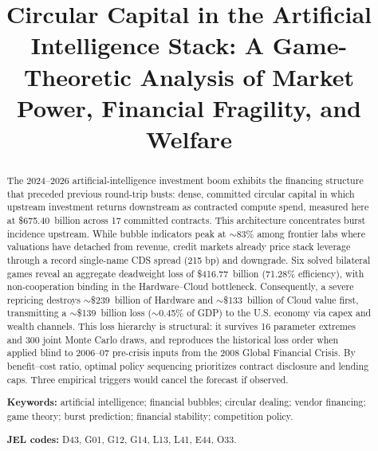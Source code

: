 \documentclass[11pt,a4paper]{article}
\title{Circular Capital in the Artificial Intelligence Stack:
A Game-Theoretic Analysis of Market Power, Financial Fragility, and Welfare}
\author{}
\date{}
\begin{document}
\maketitle
\begin{abstract}
\noindent The 2024--2026 artificial-intelligence investment boom exhibits the
financing structure that preceded previous round-trip busts: dense,
committed circular capital in which upstream investment returns
downstream as contracted compute spend, measured here at \$675.40~billion
across 17 committed contracts. This architecture concentrates burst
incidence upstream. While bubble indicators peak at $\sim$83\% among
frontier labs where valuations have detached from revenue, credit
markets already price stack leverage through a record single-name CDS
spread (215 bp) and downgrade. Six solved bilateral games reveal an
aggregate deadweight loss of \$416.77~billion (71.28\% efficiency),
with non-cooperation binding in the Hardware--Cloud bottleneck.
Consequently, a severe repricing destroys $\sim$\$239~billion of Hardware
and $\sim$\$133~billion of Cloud value first, transmitting a $\sim$\$139~billion
loss ($\sim$0.45\% of GDP) to the U.S. economy via capex and
wealth channels. This loss hierarchy is structural: it survives 16
parameter extremes and 300 joint Monte Carlo draws, and reproduces the
historical loss order when applied blind to 2006--07 pre-crisis inputs from
the 2008 Global Financial Crisis. By benefit--cost ratio, optimal policy sequencing prioritizes
contract disclosure and lending caps. Three empirical
triggers would cancel the forecast if observed.
\medskip

\noindent\textbf{Keywords:} artificial intelligence; financial bubbles;
circular dealing; vendor financing; game theory; burst prediction;
financial stability; competition policy.
\medskip

\noindent\textbf{JEL codes:} D43, G01, G12, G14, L13, L41, E44, O33.
\end{abstract}
\newpage
\begingroup
\setlength{\parskip}{0pt}
\small\tableofcontents
\endgroup
\newpage
\end{document}

